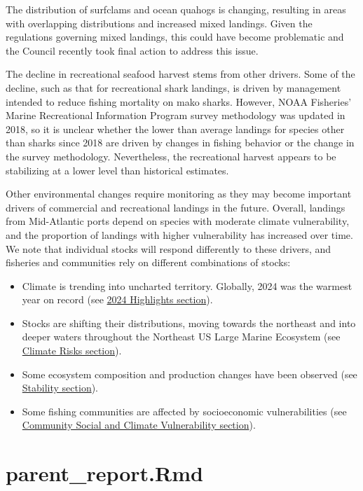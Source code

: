 \documentclass[
  10pt,
]{article}
\providecommand{\tightlist}{%
  \setlength{\itemsep}{0pt}\setlength{\parskip}{0pt}}
\begin{document}
The distribution of surfclams and ocean quahogs is changing, resulting in areas with overlapping distributions and increased mixed landings. Given the regulations governing mixed landings, this could have become problematic and the Council recently took final action to address this issue.

The decline in recreational seafood harvest stems from other drivers. Some of the decline, such as that for recreational shark landings, is driven by management intended to reduce fishing mortality on mako sharks. However, NOAA Fisheries' Marine Recreational Information Program survey methodology was updated in 2018, so it is unclear whether the lower than average landings for species other than sharks since 2018 are driven by changes in fishing behavior or the change in the survey methodology. Nevertheless, the recreational harvest appears to be stabilizing at a lower level than historical estimates.

Other environmental changes require monitoring as they may become important drivers of commercial and recreational landings in the future. Overall, landings from Mid-Atlantic ports depend on species with moderate climate vulnerability, and the proportion of landings with higher vulnerability has increased over time. We note that individual stocks will respond differently to these drivers, and fisheries and communities rely on different combinations of stocks:

\begin{itemize}
\tightlist
\item
  Climate is trending into uncharted territory. Globally, 2024 was the warmest year on record (see \hyperref[highlights]{2024 Highlights section}).
\item
  Stocks are shifting their distributions, moving towards the northeast and into deeper waters throughout the Northeast US Large Marine Ecosystem (see \hyperref[climate-and-ecosystem-change]{Climate Risks section}).
\item
  Some ecosystem composition and production changes have been observed (see \hyperref[stability]{Stability section}).
\item
  Some fishing communities are affected by socioeconomic vulnerabilities (see \hyperref[community-social-and-climate-vulnerability]{Community Social and Climate Vulnerability section}).
\end{itemize}

\section{parent\_report.Rmd}\label{parent_report.rmd-1}
\end{document}
